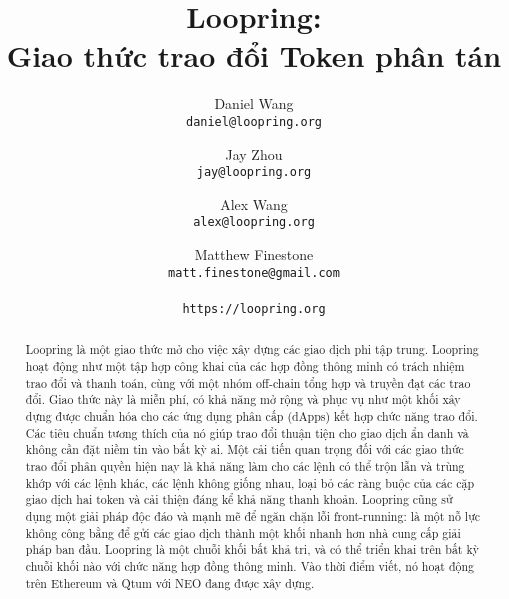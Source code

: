 \documentclass[12pt,a4paper]{article}
\title{\textbf{Loopring:}\\\textbf{Giao thức trao đổi Token phân tán}}
\author{
  Daniel Wang\\
  \texttt{daniel@loopring.org}\\
  \and
    Jay Zhou\\
    \texttt{jay@loopring.org}\\
    \and
    Alex Wang\\
    \texttt{alex@loopring.org}\\
    \and
    Matthew Finestone\\
    \texttt{matt.finestone@gmail.com}\\
  \\
  \texttt{https://loopring.org}
 }
\begin{document}
\maketitle

\begin{abstract}
Loopring là một giao thức mở cho việc xây dựng các giao dịch phi tập trung.  Loopring hoạt động như một tập hợp công khai của các hợp đồng thông minh có trách nhiệm trao đổi và thanh toán, cùng với một nhóm off-chain tổng hợp và truyền đạt các trao đổi. Giao thức này là miễn phí, có khả năng mở rộng và phục vụ như một khối xây dựng được chuẩn hóa cho các ứng dụng phân cấp (dApps) kết hợp chức năng trao đổi. Các tiêu chuẩn tương thích của nó giúp trao đổi thuận tiện cho giao dịch ẩn danh và không cần đặt niềm tin vào bất kỳ ai. Một cải tiến quan trọng đối với các giao thức trao đổi phân quyền hiện nay là khả năng làm cho các lệnh có thể trộn lẫn và trùng khớp với các lệnh khác, các lệnh không giống nhau, loại bỏ các ràng buộc của các cặp giao dịch hai token và cải thiện đáng kể khả năng thanh khoản. Loopring cũng sử dụng một giải pháp độc đáo và mạnh mẽ để ngăn chặn lỗi front-running: là một nỗ lực không công bằng để gửi các giao dịch thành một khối nhanh hơn nhà cung cấp giải pháp ban đầu. Loopring là một chuỗi khối bất khả tri, và có thể triển khai trên bất kỳ chuỗi khối nào với chức năng hợp đồng thông minh. Vào thời điểm viết, nó hoạt động trên Ethereum \cite{nakamoto2008bitcoin} \cite{desotocapital} và Qtum \cite{coincheckhack} với NEO \cite{fakevolume} đang được xây dựng.
\end{abstract}
\end{document}
